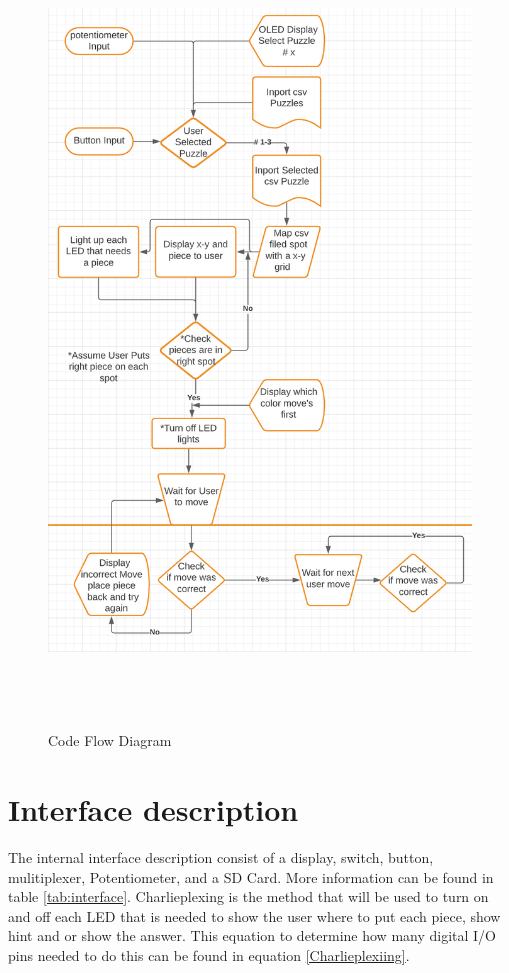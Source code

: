 \documentclass[11pt]{article}
\begin{document}
\begin{center}
\begin{figure}
  \includegraphics[width=17cm,height=21cm]{./Pics/Code_Flow_Diagram.PNG}
  \caption{Code Flow Diagram}
  \label{fig:CFD1}
\end{figure}
\end{center}

\section{Interface description}
The internal interface description consist of a display, switch, button, mulitiplexer, Potentiometer, and a SD Card. More information can be found in table \ref{tab:interface}. Charlieplexing is the method that will be used to turn on and off each LED that is needed to show the user where to put each piece, show hint and or show the answer. This equation to determine how many digital I/O pins needed to do this can be found in equation \eqref{Charlieplexiing}.
\end{document}
